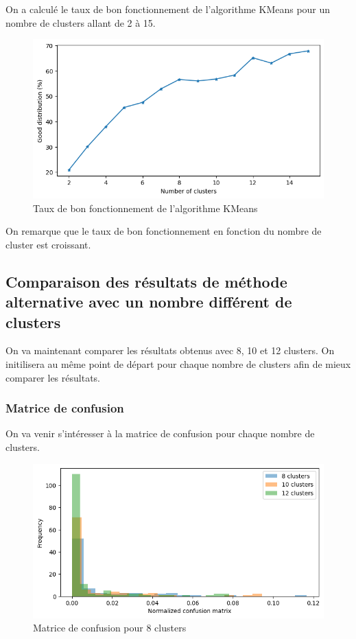 \documentclass[french,a4paper,18pt]{article}
\begin{document}
On a calculé le taux de bon fonctionnement de l'algorithme KMeans pour un nombre de clusters allant de 2 à 15.

\begin{figure}[h!]
    \centering
    \includegraphics[scale=0.4]{images/mnist_kmeans_good_distribution.png}
    \caption{Taux de bon fonctionnement de l'algorithme KMeans}\label{fig:mnist_kmeans_score}
\end{figure}
On remarque que le taux de bon fonctionnement en fonction du nombre de cluster est croissant.

\subsection{Comparaison des résultats de méthode alternative avec un nombre différent de clusters}

On va maintenant comparer les résultats obtenus avec 8, 10 et 12 clusters.
On initilisera au même point de départ pour chaque nombre de clusters afin de mieux comparer les résultats.

\subsubsection{Matrice de confusion}
On va venir s'intéresser à la matrice de confusion pour chaque nombre de clusters. 

\begin{figure}[h!]
    \centering
    \includegraphics[scale=0.5]{images/mnist_kmeans_normalized_confusion_matrix_comparaison.png}
    \caption{Matrice de confusion pour 8 clusters}\label{fig:mnist_kmeans_confusion_comparaison}
\end{figure}
\end{document}
